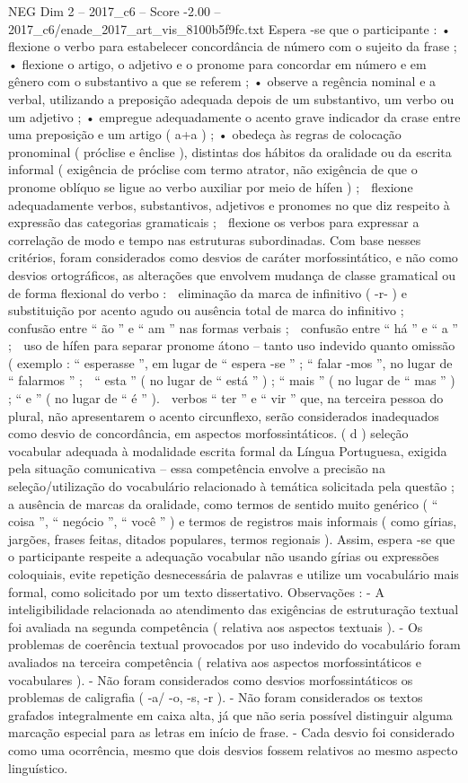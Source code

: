 \begin{textsample}{NEG Dim 2 – 2017\_c6 – Score -2.00 – 2017\_c6/enade\_2017\_art\_vis\_8100b5f9fc.txt}
Espera -se que o participante : • flexione o verbo para estabelecer concordância de número com o sujeito da frase ; • flexione o artigo, o adjetivo e o pronome para concordar em número e em gênero com o substantivo a que se referem ; • observe a regência nominal e a verbal, utilizando a preposição adequada depois de um substantivo, um verbo ou um adjetivo ; • empregue adequadamente o acento grave indicador da crase entre uma preposição e um artigo ( a+a ) ; • obedeça às regras de colocação pronominal ( próclise e ênclise ), distintas dos hábitos da oralidade ou da escrita informal ( exigência de próclise com termo atrator, não exigência de que o pronome oblíquo se ligue ao verbo auxiliar por meio de hífen ) ;  flexione adequadamente verbos, substantivos, adjetivos e pronomes no que diz respeito à expressão das categorias gramaticais ;  flexione os verbos para expressar a correlação de modo e tempo nas estruturas subordinadas.
Com base nesses critérios, foram considerados como desvios de caráter morfossintático, e não como desvios ortográficos, as alterações que envolvem mudança de classe gramatical ou de forma flexional do verbo :  eliminação da marca de infinitivo ( -r- ) e substituição por acento agudo ou ausência total de marca do infinitivo ;  confusão entre “ ão ” e “ am ” nas formas verbais ;  confusão entre “ há ” e “ a ” ;  uso de hífen para separar pronome átono – tanto uso indevido quanto omissão ( exemplo : “ esperasse ”, em lugar de “ espera -se ” ; “ falar -mos ”, no lugar de “ falarmos ” ;  “ esta ” ( no lugar de “ está ” ) ; “ mais ” ( no lugar de “ mas ” ) ; “ e ” ( no lugar de “ é ” ).  verbos “ ter ” e “ vir ” que, na terceira pessoa do plural, não apresentarem o acento circunflexo, serão considerados inadequados como desvio de concordância, em aspectos morfossintáticos. ( d ) seleção vocabular adequada à modalidade escrita formal da Língua Portuguesa, exigida pela situação comunicativa – essa competência envolve a precisão na seleção/utilização do vocabulário relacionado à temática solicitada pela questão ; a ausência de marcas da oralidade, como termos de sentido muito genérico ( “ coisa ”, “ negócio ”, “ você ” ) e termos de registros mais informais ( como gírias, jargões, frases feitas, ditados populares, termos regionais ).
Assim, espera -se que o participante respeite a adequação vocabular não usando gírias ou expressões coloquiais, evite repetição desnecessária de palavras e utilize um vocabulário mais formal, como solicitado por um texto dissertativo.
Observações : - A inteligibilidade relacionada ao atendimento das exigências de estruturação textual foi avaliada na segunda competência ( relativa aos aspectos textuais ). - Os problemas de coerência textual provocados por uso indevido do vocabulário foram avaliados na terceira competência ( relativa aos aspectos morfossintáticos e vocabulares ). - Não foram considerados como desvios morfossintáticos os problemas de caligrafia ( -a/ -o, -s, -r ). - Não foram considerados os textos grafados integralmente em caixa alta, já que não seria possível distinguir alguma marcação especial para as letras em início de frase. - Cada desvio foi considerado como uma ocorrência, mesmo que dois desvios fossem relativos ao mesmo aspecto linguístico.

\end{textsample}
